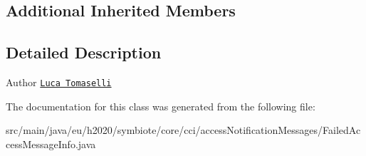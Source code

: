 \subsection*{Additional Inherited Members}


\subsection{Detailed Description}
\begin{DoxyAuthor}{Author}
\href{mailto:l.tomaselli@nextworks.it}{\tt Luca Tomaselli} 
\end{DoxyAuthor}


The documentation for this class was generated from the following file\+:\begin{DoxyCompactItemize}
\item 
src/main/java/eu/h2020/symbiote/core/cci/access\+Notification\+Messages/Failed\+Access\+Message\+Info.\+java\end{DoxyCompactItemize}
